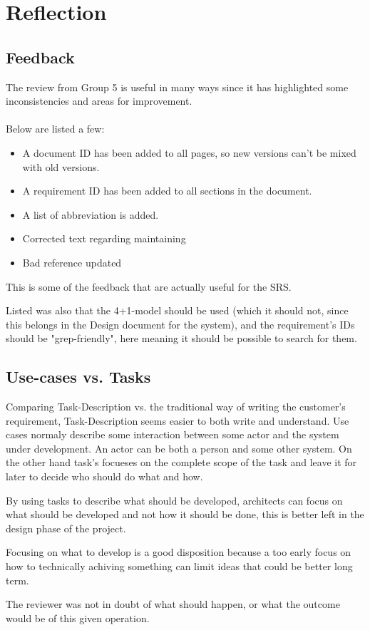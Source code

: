\documentclass[Main]{subfiles}
\begin{document}
\chapter{Reflection}

\section{Feedback}

The review from Group 5 is useful in many ways since it has highlighted some inconsistencies and areas for improvement.
\\
\\
Below are listed a few:

\begin{itemize}

\item A document ID has been added to all pages, so new versions can't be mixed with old versions.

\item A requirement ID has been added to all sections in the document.

\item A list of abbreviation is added.

\item Corrected text regarding maintaining

\item Bad reference updated 

\end{itemize}
This is some of the feedback that are actually useful for the SRS.

Listed was also that the 4+1-model should be used (which it should not, since this belongs in the Design document for the system), and the requirement's IDs should be "grep-friendly", here meaning it should be possible to search for them.

\section{Use-cases vs. Tasks}

Comparing Task-Description vs. the traditional way of writing the customer's requirement, Task-Description seems easier to both write and understand.
Use cases normaly describe some interaction between some actor and the system under development.
An actor can be both a person and some other system.
On the other hand task's focueses on the complete scope of the task and leave it for later to decide who should do what and how.

By using tasks to describe what should be developed, architects can focus on what should be developed and not how it should be done, this is better left in the design phase of the project.

Focusing on what to develop is a good disposition because a too early focus on how to technically achiving something can limit ideas that could be better long term.

The reviewer was not in doubt of what should happen, or what the outcome would be of this given operation.
\end{document}
